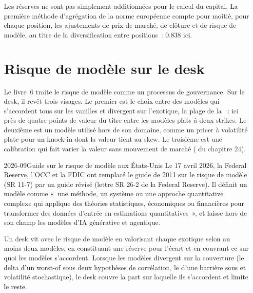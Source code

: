 Les réserves ne sont pas simplement additionnées pour le calcul du capital. La première méthode d'agrégation de la norme européenne compte pour moitié, pour chaque position, les ajustements de prix de marché, de clôture et de risque de
modèle, au titre de la diversification entre positions~: 0.838 ici.

\section{Risque de modèle sur le desk}

Le livre~6 traite le risque de modèle comme un processus de gouvernance. Sur le desk, il revêt trois visages. Le premier est le choix entre des modèles qui s'accordent tous sur les vanilles et divergent sur
l'exotique, la plage de la ~: ici près de quatre points de valeur du titre entre les modèles plats à deux strikes. Le deuxième est un modèle utilisé hors de son
domaine, comme un pricer à volatilité plate pour un knock-in dont la valeur tient au skew. Le troisième est une calibration qui fait varier la valeur sans mouvement de marché
( du chapitre 24).

\begin{dated}{2026-09}{Guide sur le risque de modèle aux États-Unis}\label{dat:dv:managing-an-exotic-book:mrm}
Le 17 avril 2026, la Federal Reserve, l'OCC et la FDIC ont remplacé le guide de 2011 sur le risque de modèle (SR 11-7) par un guide révisé (lettre SR 26-2 de la Federal Reserve).
Il définit un modèle comme «~une méthode, un système ou une approche quantitative complexe qui applique des théories statistiques, économiques ou financières pour transformer des données d'entrée en
estimations quantitatives~», et laisse hors de son champ les modèles d'IA générative et agentique.
\end{dated}

Un desk vit avec le risque de modèle en valorisant chaque exotique selon au moins deux modèles, en constituant une réserve pour l'écart et en couvrant ce sur quoi les modèles s'accordent. Lorsque les modèles
divergent sur la couverture (le delta d'un worst-of sous deux hypothèses de corrélation, le  d'une barrière sous  et volatilité stochastique), le desk couvre
la part sur laquelle ils s'accordent et limite le reste.

